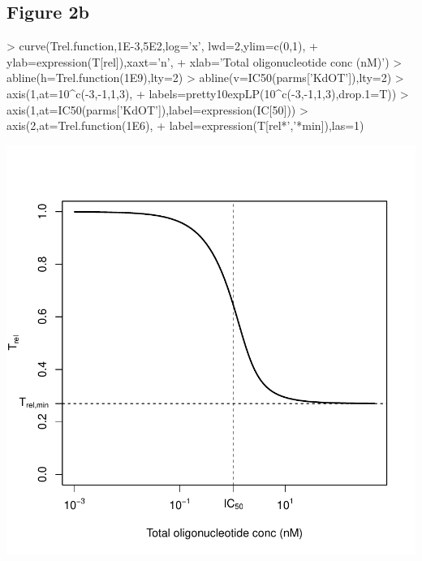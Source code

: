 \documentclass{article}
\begin{document}
\subsection*{Figure 2b}
\begin{Schunk}
\begin{Sinput}
> curve(Trel.function,1E-3,5E2,log='x', lwd=2,ylim=c(0,1),
+       ylab=expression(T[rel]),xaxt='n',
+       xlab='Total oligonucleotide conc (nM)')
> abline(h=Trel.function(1E9),lty=2)
> abline(v=IC50(parms['KdOT']),lty=2)
> axis(1,at=10^c(-3,-1,1,3),
+      labels=pretty10expLP(10^c(-3,-1,1,3),drop.1=T))
> axis(1,at=IC50(parms['KdOT']),label=expression(IC[50]))
> axis(2,at=Trel.function(1E6),
+      label=expression(T[rel*','*min]),las=1)
\end{Sinput}
\end{Schunk}
\includegraphics{Vignette2-007}
\end{document}
